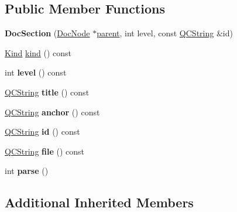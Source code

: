 \subsection*{Public Member Functions}
\begin{DoxyCompactItemize}
\item 
\mbox{\label{class_doc_section_aba57080652e8febfe7bb550438d59df7}} 
{\bfseries Doc\+Section} (\mbox{\hyperlink{class_doc_node}{Doc\+Node}} $\ast$\mbox{\hyperlink{class_doc_node_a73e8ad29a91cfceb0968eb00db71a23d}{parent}}, int level, const \mbox{\hyperlink{class_q_c_string}{Q\+C\+String}} \&id)
\item 
\mbox{\hyperlink{class_doc_node_aebd16e89ca590d84cbd40543ea5faadb}{Kind}} \mbox{\hyperlink{class_doc_section_a38453b63370b56069f21b249a7f6f0ba}{kind}} () const
\item 
\mbox{\label{class_doc_section_a86d69300a2a90eeacd2d1422bccc2e2b}} 
int {\bfseries level} () const
\item 
\mbox{\label{class_doc_section_aa55e3fae9516cdadcf0c8b9a0c14d444}} 
\mbox{\hyperlink{class_q_c_string}{Q\+C\+String}} {\bfseries title} () const
\item 
\mbox{\label{class_doc_section_abcd4b7aefb6d755c6c7eb310e225f1a9}} 
\mbox{\hyperlink{class_q_c_string}{Q\+C\+String}} {\bfseries anchor} () const
\item 
\mbox{\label{class_doc_section_aabb76879ce44d2a5c2df64f37a3bade7}} 
\mbox{\hyperlink{class_q_c_string}{Q\+C\+String}} {\bfseries id} () const
\item 
\mbox{\label{class_doc_section_a455df233c8ff5617d235a6d63908ab7b}} 
\mbox{\hyperlink{class_q_c_string}{Q\+C\+String}} {\bfseries file} () const
\item 
\mbox{\label{class_doc_section_a7c92ebabb4381f1bd83cd5f1db4ebc15}} 
int {\bfseries parse} ()
\end{DoxyCompactItemize}
\subsection*{Additional Inherited Members}


